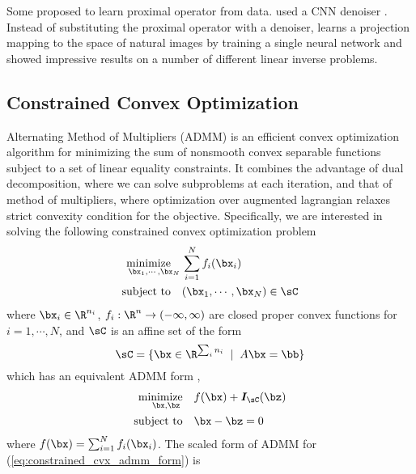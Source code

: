 \documentclass[11pt]{article}
\renewcommand{\sI}{\boldsymbol{I}}
\newcommand{\minimize}{\text{minimize}\quad}
\newcommand{\subjectto}{\text{subject to}\quad}
\begin{document}
$ $\\ 
Some proposed to learn proximal operator from data. \cite{meinhardtLearningProximalOperators2017} used a CNN denoiser \cite{zhangGaussianDenoiserResidual2017}. Instead of substituting the proximal operator with a denoiser, \cite{changOneNetworkSolve2017} learns a projection mapping to the space of natural images by training a single neural network and showed impressive results on a number of different linear inverse problems.

\subsection{Constrained Convex Optimization}

Alternating Method of Multipliers (ADMM) is an efficient convex optimization algorithm for minimizing the sum of nonsmooth convex separable functions subject to a set of linear equality constraints. It combines the advantage of dual decomposition, where we can solve subproblems at each iteration, and that of method of multipliers, where optimization over augmented lagrangian relaxes strict convexity condition for the objective.\cite{boydDistributedOptimizationStatistical2011} Specifically, we are interested in solving the following constrained convex optimization problem
\begin{equation}
    \label{eq:constrained_cvx}
    \begin{aligned}
        \underset{\bx_1,\cdots,\bx_N}{\minimize}  & \sum_{i=1}^N f_i(\bx_i) \\
        \subjectto & (\bx_1,\cdots,\bx_N) \in \sC \\
    \end{aligned}
\end{equation}
where $\bx_i\in\R^{n_i}$, $f_i: \R^{n} \to (-\infty,\infty)$ are closed proper convex functions for $i=1,\cdots,N$, and $\sC$ is an affine set of the form
\[
    \sC = \{ \bx \in\R^{\sum_i n_i} \;\mid\; A \bx = \bb \}    
\]
which has an equivalent ADMM form \cite{boydDistributedOptimizationStatistical2011},
\begin{equation}
    \label{eq:constrained_cvx_admm_form}
    \begin{aligned}
        \underset{\bx,\bz}{\minimize}  & f(\bx) + \sI_{\sC}(\bz) \\
        \subjectto & \bx - \bz = 0 \\
    \end{aligned}
\end{equation}
where $f(\bx) = \sum_{i=1}^N f_i(\bx_i)$. The scaled form of ADMM for (\ref{eq:constrained_cvx_admm_form}) is 
\end{document}
